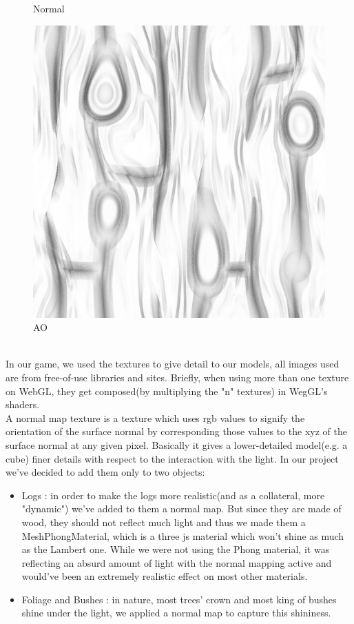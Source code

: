 \documentclass[a4paper, 11pt]{article}
\begin{document}
\begin{figure}[!h]
  \caption{Normal}\label{fig:n_img}
\endminipage\hfill
{}%
  \includegraphics[width=\linewidth]{sidelogao.jpg}
  \caption{AO}\label{fig:ao_img}
\endminipage
\end{figure}
\\
In our game, we used the textures to give detail to our models, all images used are from free-of-use libraries and sites. Briefly, when using more than one texture on WebGL, they get composed(by multiplying the "n" textures) in WegGL's shaders.\\
A normal map texture is a texture which uses rgb values to signify the orientation of the surface normal by corresponding those values to the xyz of the surface normal at any given pixel. Basically it gives a lower-detailed model(e.g. a cube) finer details with respect to the interaction with the light. In our project we've decided to add them only to two objects:
\begin{itemize}
\item Logs : in order to make the logs more realistic(and as a collateral, more "dynamic") we've added to them a normal map. But since they are made of wood, they should not reflect much light and thus we made them a MeshPhongMaterial, which is a three js material which won't shine as much as the Lambert one. While we were not using the Phong material, it was reflecting an absurd amount of light with the normal mapping active and would've been an extremely realistic effect on most other materials.
\item Foliage and Bushes : in nature, most trees' crown and most king of bushes shine under the light, we applied a normal map to capture this shininess.
\end{itemize}
\end{document}
